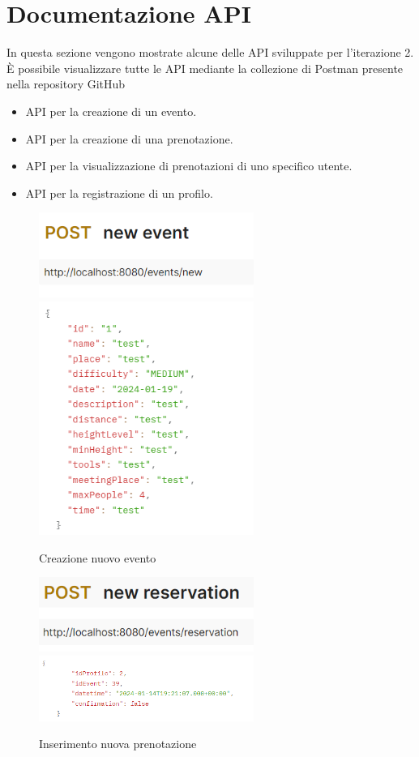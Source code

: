 \section{Documentazione API}
In questa sezione vengono mostrate alcune delle API sviluppate per l’iterazione 2. 
È possibile visualizzare tutte le API mediante la collezione di Postman presente nella repository GitHub
\begin{itemize}
    \item API per la creazione di un evento.
    \item API per la creazione di una prenotazione.
    \item API per la visualizzazione di prenotazioni di uno specifico utente.
    \item API per la registrazione di un profilo.
\end{itemize}


\newpage

\begin{figure}[h!]
\includegraphics[width=7cm]{test/postman/tnewevent.PNG}\\
\includegraphics[width=7cm]{test/postman/newevent.PNG}\\
\caption{Creazione nuovo evento}
\end{figure}

\begin{figure}[h!]
\includegraphics[width=7cm]{test/postman/tnewres.PNG}\\
\includegraphics[width=7cm]{test/postman/newres.PNG}\\
\caption{Inserimento nuova prenotazione}
\end{figure}

